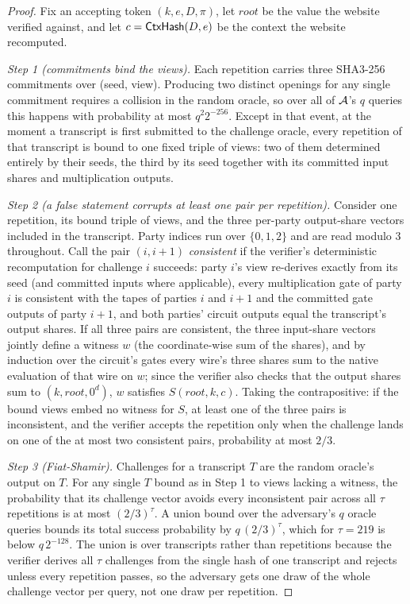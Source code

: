 \documentclass[11pt]{article}
\theoremstyle{definition}
\begin{document}
\begin{proof}
Fix an accepting token $(k, e, D, \pi)$, let $\mathit{root}$ be the value the website
verified against, and let $c = \mathsf{CtxHash}(D, e)$ be the context the website recomputed.

\emph{Step 1 (commitments bind the views).} Each repetition carries three SHA3-256
commitments over (seed, view). Producing two distinct openings for any single commitment
requires a collision in the random oracle, so over all of $\mathcal{A}$'s $q$ queries this
happens with probability at most $q^2 2^{-256}$. Except in that event, at the moment a
transcript is first submitted to the challenge oracle, every repetition of that transcript
is bound to one fixed triple of views: two of them determined entirely by their seeds, the
third by its seed together with its committed input shares and multiplication outputs.

\emph{Step 2 (a false statement corrupts at least one pair per repetition).} Consider one
repetition, its bound triple of views, and the three per-party output-share vectors
included in the transcript. Party indices run over $\{0,1,2\}$ and are read modulo 3
throughout. Call the pair $(i, i{+}1)$ \emph{consistent} if the verifier's
deterministic recomputation for challenge $i$ succeeds: party $i$'s view re-derives
exactly from its seed (and committed inputs where applicable), every multiplication gate
of party $i$ is consistent with the tapes of parties $i$ and $i{+}1$ and the committed
gate outputs of party $i{+}1$, and both parties' circuit outputs equal the transcript's
output shares. If all three pairs are consistent, the three input-share vectors jointly
define a witness $w$ (the coordinate-wise sum of the shares), and by induction over the
circuit's gates every wire's three shares sum to the native evaluation of that wire on
$w$; since the verifier also checks that the output shares sum to $(k, \mathit{root},
0^d)$, $w$ satisfies $S(\mathit{root}, k, c)$. Taking the contrapositive: if the bound
views embed no witness for $S$, at least one of the three pairs is inconsistent, and the
verifier accepts the repetition only when the challenge lands on one of the at most two
consistent pairs, probability at most $2/3$.

\emph{Step 3 (Fiat-Shamir).} Challenges for a transcript $T$ are the random oracle's
output on $T$. For any single $T$ bound as in Step 1 to views lacking a witness, the
probability that its challenge vector avoids every inconsistent pair across all $\tau$
repetitions is at most $(2/3)^\tau$. A union bound over the adversary's $q$ oracle queries
bounds its total success probability by $q\,(2/3)^\tau$, which for $\tau = 219$ is below
$q\,2^{-128}$. The union is over transcripts rather than repetitions because the verifier
derives all $\tau$ challenges from the single hash of one transcript and rejects unless
every repetition passes, so the adversary gets one draw of the whole challenge vector per
query, not one draw per repetition.


\end{proof}
\end{document}
